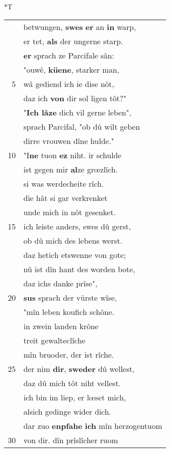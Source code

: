 \documentclass[8pt,a4paper,notitlepage]{article}
\begin{document}
\begin{table}[ht]
\begin{minipage}[t]{0.5\linewidth}
\small
\begin{center}*T
\end{center}
\begin{tabular}{rl}
 & betwungen, \textbf{swes} \textbf{er} an \textbf{in} warp,\\ 
 & er tet, \textbf{als} der ungerne starp.\\ 
 & \textbf{er} sprach ze Parcifale sân:\\ 
 & "ouwê, \textbf{küene}, starker man,\\ 
5 & wâ gediend ich ie dise nôt,\\ 
 & daz ich \textbf{von} dir sol ligen tôt?"\\ 
 & "\textbf{Ich lâze} dich vil gerne leben",\\ 
 & sprach Parcifal, "ob dû wilt geben\\ 
 & dirre vrouwen dîne hulde."\\ 
10 & "I\textbf{ne} tuon \textbf{ez} niht. ir schulde\\ 
 & ist gegen mir \textbf{al}ze grœzlîch.\\ 
 & si was werdecheite rîch.\\ 
 & die hât si gar verkrenket\\ 
 & unde mich in nôt gesenket.\\ 
15 & ich leiste anders, swes dû gerst,\\ 
 & ob dû mich des lebens werst.\\ 
 & daz hetich etswenne von gote;\\ 
 & nû ist dîn hant des worden bote,\\ 
 & daz ichs danke prîse",\\ 
20 & \textbf{sus} sprach der vürste wîse,\\ 
 & "mîn leben koufich schône.\\ 
 & in zwein landen krône\\ 
 & treit gewalteclîche\\ 
 & mîn bruoder, der ist rîche.\\ 
25 & der nim \textbf{dir}, \textbf{sweder} dû wellest,\\ 
 & daz dû mich tôt niht vellest.\\ 
 & ich bin im liep, er lœset mich,\\ 
 & alsich gedinge wider dich.\\ 
 & dar zuo \textbf{enpfahe} \textbf{ich} mîn herzogentuom\\ 
30 & von dir. dîn prîslîcher ruom\\ 
\end{tabular}

\end{minipage}
\end{table}
\end{document}
